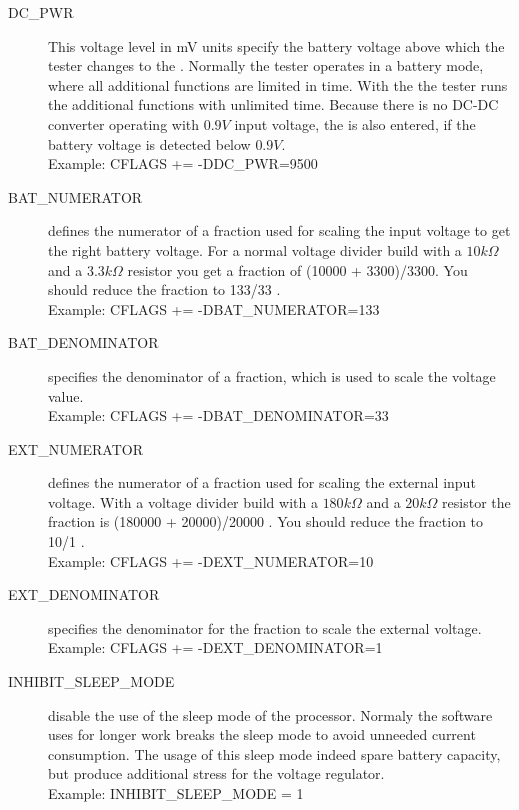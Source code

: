\begin{description}
  \item[DC\_PWR] This voltage level in mV units specify the battery voltage above which the tester
changes to the . Normally the tester operates in a battery mode, where all additional
functions are limited in time. With the  the tester runs the additional functions with unlimited time.
Because there is no DC-DC converter operating with \(0.9V\) input voltage,
the  is also entered, if the battery voltage is detected below \(0.9V\). \\
Example: CFLAGS += -DDC\_PWR=9500

 \item[BAT\_NUMERATOR] defines the numerator of a fraction used for scaling the input voltage to get the right
battery voltage.
For a normal voltage divider build with a \(10 k\Omega\) and a \(3.3 k\Omega\) resistor you get a fraction 
of (10000 + 3300)/3300. 
You should reduce the fraction to 133/33 .\\
Example: CFLAGS += -DBAT\_NUMERATOR=133

 \item[BAT\_DENOMINATOR] specifies the denominator of a fraction, which is used to scale the voltage value.\\
Example: CFLAGS += -DBAT\_DENOMINATOR=33

 \item[EXT\_NUMERATOR] defines the numerator of a fraction used for scaling the external input voltage.
 With a voltage divider build with a \(180 k\Omega\) and a \(20 k\Omega\) resistor the fraction is (180000 + 20000)/20000 .
You should reduce the fraction to 10/1 .\\
Example: CFLAGS += -DEXT\_NUMERATOR=10

 \item[EXT\_DENOMINATOR] specifies the denominator for the fraction to scale the external voltage. \\
Example: CFLAGS += -DEXT\_DENOMINATOR=1

  \item[INHIBIT\_SLEEP\_MODE] disable the use of the sleep mode of the processor.
Normaly the software uses for longer work breaks the sleep mode to avoid unneeded current consumption.
The usage of this sleep mode indeed spare battery capacity, but produce additional stress for the voltage regulator.\\
Example: INHIBIT\_SLEEP\_MODE = 1


\end{description}
